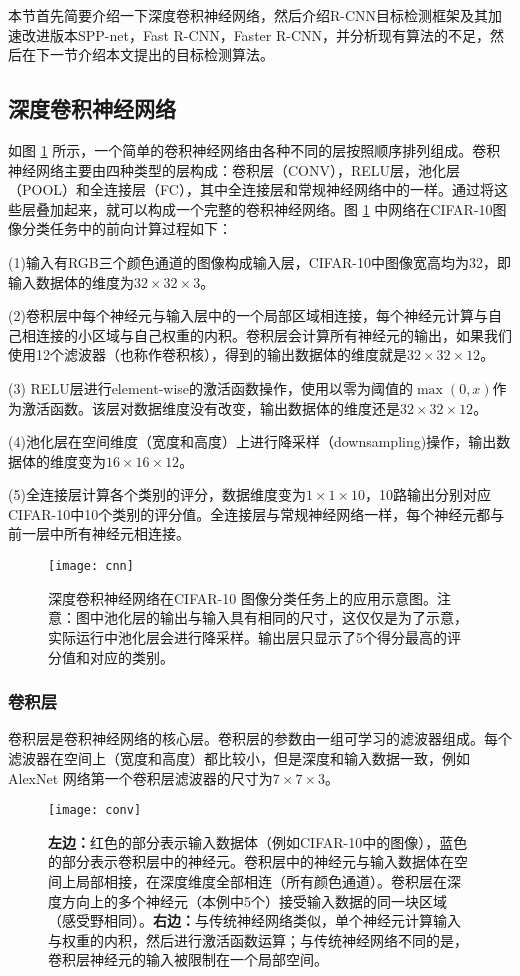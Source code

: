 本节首先简要介绍一下深度卷积神经网络，然后介绍R-CNN目标检测框架及其加速改进版本SPP-net，Fast R-CNN，Faster R-CNN，并分析现有算法的不足，然后在下一节介绍本文提出的目标检测算法。

\subsection{深度卷积神经网络}
如图 \ref{cnn} 所示，一个简单的卷积神经网络由各种不同的层按照顺序排列组成。卷积神经网络主要由四种类型的层构成：卷积层（CONV），RELU层，池化层（POOL）和全连接层（FC），其中全连接层和常规神经网络中的一样。通过将这些层叠加起来，就可以构成一个完整的卷积神经网络。图 \ref{cnn} 中网络在CIFAR-10图像分类任务中的前向计算过程如下：
\begin{namelist}{}
	\item (1)输入有RGB三个颜色通道的图像构成输入层，CIFAR-10中图像宽高均为32，即输入数据体的维度为$32\times32\times3$。
	\item (2)卷积层中每个神经元与输入层中的一个局部区域相连接，每个神经元计算与自己相连接的小区域与自己权重的内积。卷积层会计算所有神经元的输出，如果我们使用12个滤波器（也称作卷积核），得到的输出数据体的维度就是$32\times32\times12$。
	\item (3) RELU层进行element-wise的激活函数操作，使用以零为阈值的$\max(0,x)$作为激活函数。该层对数据维度没有改变，输出数据体的维度还是$32\times32\times12$。
	\item
	(4)池化层在空间维度（宽度和高度）上进行降采样（downsampling)操作，输出数据体的维度变为$16\times16\times12$。
	\item
	(5)全连接层计算各个类别的评分，数据维度变为$1\times1\times10$，10路输出分别对应CIFAR-10中10个类别的评分值。全连接层与常规神经网络一样，每个神经元都与前一层中所有神经元相连接。
\end{namelist}
\begin{figure}[!t]
	\centering
	\texttt{[image: cnn]}
	\caption{深度卷积神经网络在CIFAR-10 \cite{cifar-10} 图像分类任务上的应用示意图。注意：图中池化层的输出与输入具有相同的尺寸，这仅仅是为了示意，实际运行中池化层会进行降采样。输出层只显示了5个得分最高的评分值和对应的类别。}
	\label{cnn}
\end{figure}

\subsubsection{卷积层}
卷积层是卷积神经网络的核心层。卷积层的参数由一组可学习的滤波器组成。每个滤波器在空间上（宽度和高度）都比较小，但是深度和输入数据一致，例如AlexNet \cite{alexnet} 网络第一个卷积层滤波器的尺寸为$7\times7\times3$。

\begin{figure}[htbp]
	\centering
	\texttt{[image: conv]}
	\caption{\textbf{左边：}红色的部分表示输入数据体（例如CIFAR-10中的图像），蓝色的部分表示卷积层中的神经元。卷积层中的神经元与输入数据体在空间上局部相接，在深度维度全部相连（所有颜色通道）。卷积层在深度方向上的多个神经元（本例中5个）接受输入数据的同一块区域（感受野相同）。\textbf{右边：}与传统神经网络类似，单个神经元计算输入与权重的内积，然后进行激活函数运算；与传统神经网络不同的是，卷积层神经元的输入被限制在一个局部空间。}
	\label{conv}
\end{figure}